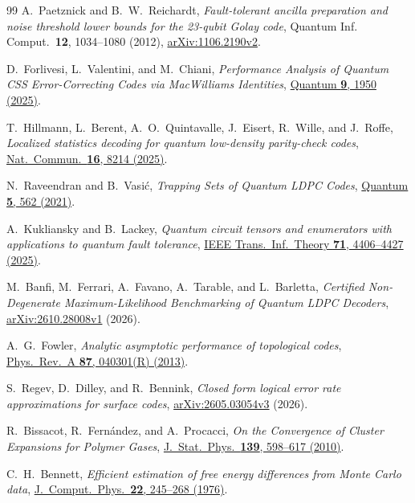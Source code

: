 \documentclass[10pt,twocolumn]{article}
\theoremstyle{definition}
\begin{document}
\begin{thebibliography}{99}
A.~Paetznick and B.~W.~Reichardt,
\emph{Fault-tolerant ancilla preparation and noise threshold lower bounds
for the 23-qubit Golay code},
Quantum Inf. Comput.\ \textbf{12}, 1034--1080 (2012),
\href{https://arxiv.org/abs/1106.2190v2}{arXiv:1106.2190v2}.

D.~Forlivesi, L.~Valentini, and M.~Chiani,
\emph{Performance Analysis of Quantum CSS Error-Correcting Codes via MacWilliams Identities},
\href{https://doi.org/10.22331/q-2025-12-16-1950}{Quantum \textbf{9}, 1950 (2025)}.

T.~Hillmann, L.~Berent, A.~O.~Quintavalle, J.~Eisert, R.~Wille, and J.~Roffe,
\emph{Localized statistics decoding for quantum low-density parity-check codes},
\href{https://doi.org/10.1038/s41467-025-63214-7}{Nat.\ Commun.\ \textbf{16}, 8214 (2025)}.

N.~Raveendran and B.~Vasi\'c, \emph{Trapping Sets of Quantum LDPC Codes},
\href{https://doi.org/10.22331/q-2021-10-14-562}{Quantum \textbf{5}, 562 (2021)}.

A.~Kukliansky and B.~Lackey,
\emph{Quantum circuit tensors and enumerators with applications to quantum fault tolerance},
\href{https://doi.org/10.1109/TIT.2025.3555189}{IEEE Trans.\ Inf.\ Theory \textbf{71}, 4406--4427 (2025)}.

M.~Banfi, M.~Ferrari, A.~Favano, A.~Tarable, and L.~Barletta,
\emph{Certified Non-Degenerate Maximum-Likelihood Benchmarking of Quantum LDPC Decoders},
\href{https://arxiv.org/abs/2610.28008v1}{arXiv:2610.28008v1} (2026).

A.~G.~Fowler, \emph{Analytic asymptotic performance of topological codes},
\href{https://doi.org/10.1103/PhysRevA.87.040301}{Phys.\ Rev.\ A \textbf{87}, 040301(R) (2013)}.

S.~Regev, D.~Dilley, and R.~Bennink,
\emph{Closed form logical error rate approximations for surface codes},
\href{https://arxiv.org/abs/2605.03054v3}{arXiv:2605.03054v3} (2026).

R.~Bissacot, R.~Fern\'andez, and A.~Procacci,
\emph{On the Convergence of Cluster Expansions for Polymer Gases},
\href{https://doi.org/10.1007/s10955-010-9956-1}{J.\ Stat.\ Phys.\ \textbf{139}, 598--617 (2010)}.

C.~H.~Bennett,
\emph{Efficient estimation of free energy differences from Monte Carlo data},
\href{https://doi.org/10.1016/0021-9991(76)90078-4}{J.\ Comput.\ Phys.\ \textbf{22}, 245--268 (1976)}.


\end{thebibliography}
\end{document}
